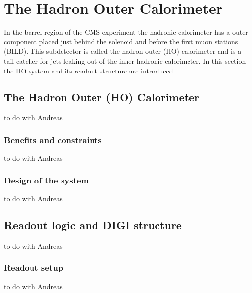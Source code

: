 \section{The Hadron Outer Calorimeter}
In the barrel region of the CMS experiment the hadronic calorimeter has a outer component placed just behind the solenoid and before the first muon stations (BILD). 
This subdetector is called the hadron outer (HO) calorimeter and is a tail catcher for jets leaking out of the inner hadronic calorimeter.
In this section the HO system and its readout structure are introduced.
	\subsection{The Hadron Outer (HO) Calorimeter}
		to do with Andreas
  		\subsubsection{Benefits and constraints}
			to do with Andreas
  		\subsubsection{Design of the system}
			to do with Andreas
	\subsection{Readout logic and DIGI structure}
		to do with Andreas
  		\subsubsection{Readout setup}
			to do with Andreas